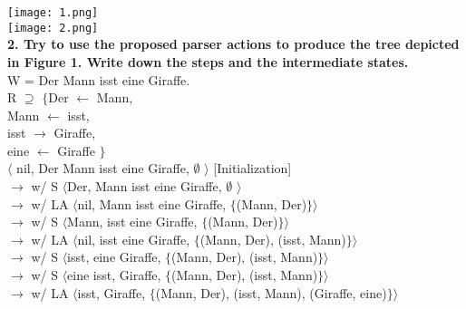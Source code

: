 \documentclass[10pt,a4paper]{article}
\begin{document}
	\texttt{[image: 1.png]} \\
	\texttt{[image: 2.png]} \\
	


\textbf{2.  Try  to  use  the  proposed  parser  actions  to  produce  the  tree  depicted  in  Figure  1. Write down the steps and the intermediate states.} 
\\
W = Der Mann isst eine Giraffe.
\\
R $\supseteq$  $ \{ $Der $\leftarrow$ Mann,\\
	Mann 	$\leftarrow$ isst,\\
	isst 	$\rightarrow$ Giraffe,\\
	eine 	$\leftarrow$ Giraffe $ \} $
\\
$\langle$ nil, Der Mann isst eine Giraffe, $\emptyset$  $\rangle$ [Initialization] \\
$\rightarrow$ w/ S $\langle$Der, Mann isst eine Giraffe, $\emptyset$  $\rangle$ \\
$\rightarrow$ w/ LA $\langle$nil, Mann isst eine Giraffe, $ \{ $(Mann, Der)$ \} $$\rangle$ \\
$\rightarrow$ w/ S $\langle$Mann, isst eine Giraffe, $ \{ $(Mann, Der)$ \} $$\rangle$ \\
$\rightarrow$ w/ LA $\langle$nil, isst eine Giraffe, $ \{ $(Mann, Der), (isst, Mann)$ \} $$\rangle$ \\
$\rightarrow$ w/ S $\langle$isst, eine Giraffe, $ \{ $(Mann, Der), (isst, Mann)$ \} $$\rangle$ \\
$\rightarrow$ w/ S $\langle$eine isst, Giraffe, $ \{ $(Mann, Der), (isst, Mann)$ \} $$\rangle$ \\
$\rightarrow$ w/ LA $\langle$isst, Giraffe, $ \{ $(Mann, Der), (isst, Mann), (Giraffe, eine)$ \} $$\rangle$ \\
\end{document}
